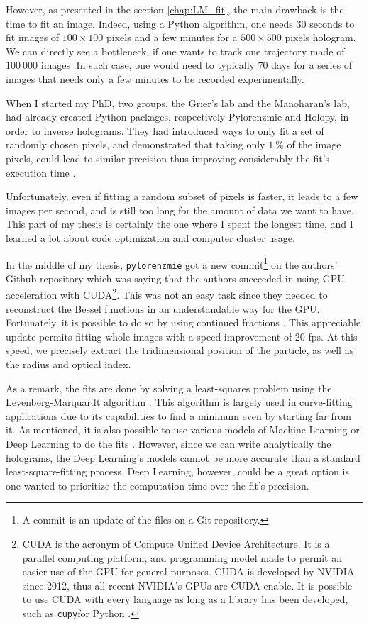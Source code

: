 However, as presented in the section \ref{chap:LM_fit}, the main drawback is the time to fit an image. Indeed, using a Python algorithm, one needs $30$ seconds to fit images of $100 \times  100$ pixels and a few minutes for a $500\times 500$ pixels hologram. We can directly see a bottleneck, if one wants to track one trajectory made of $100~000$ images .In such case, one would need to typically 70 days for a series of images that needs only a few minutes to be recorded experimentally. 

When I started my PhD, two groups, the Grier's lab and the Manoharan's lab, had already created Python packages, respectively Pylorenzmie and Holopy, in order to inverse holograms. They had introduced ways to only fit a set of randomly chosen pixels, and demonstrated that taking only $1~\%$ of the image pixels, could lead to similar precision thus improving considerably the fit's execution time \cite{dimiduk_random-subset_2014}.

Unfortunately, even if fitting  a random subset of pixels is faster, it leads to a few images per second, and is still too long for the amount of data we want to have. This part of my thesis is certainly the one where I spent the longest time, and I learned a lot about code optimization and computer cluster usage. 

In the middle of my thesis, \texttt{pylorenzmie} got a new commit\footnote{A commit is an update of the files on a Git repository.} on the authors' Github repository which was saying that the authors succeeded in using GPU acceleration with CUDA\footnote{CUDA is the acronym of Compute Unified Device Architecture. It is a parallel computing platform, and programming model made to permit an easier use of the GPU for general purposes. CUDA is developed by NVIDIA since 2012, thus all recent NVIDIA's GPUs are CUDA-enable. It is possible to use CUDA with every language as long as a library has been developed, such as \texttt{cupy}for Python \href{https://github.com/cupy/cupy}{\faGithub}.}. This was not an easy task since they needed to reconstruct the Bessel functions in an understandable way for the GPU. Fortunately, it is possible to do so by using continued fractions \cite{lentz_generating_1976}. This appreciable update permits fitting whole images with a speed improvement of 20 fps. At this speed, we  precisely extract the tridimensional position of the particle, as well as the radius and optical index. 

As a remark, the fits are done by solving a least-squares problem using the Levenberg-Marquardt algorithm \cite{more_levenberg-marquardt_1978}. This algorithm is largely used in curve-fitting applications due to its capabilities to find a minimum even by starting far from it. As mentioned, it is also possible to use various models of Machine Learning or Deep Learning to do the fits \cite{altman_catch_2020}. However, since we can write analytically the holograms, the Deep Learning’s models cannot be more accurate than a standard least-square-fitting process. Deep Learning, however, could be a great option is one wanted to prioritize the computation time over the fit's precision.


